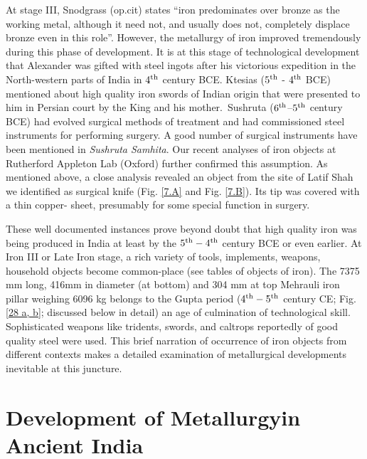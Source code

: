 At stage III, Snodgrass (op.cit) states “iron predominates over bronze as the working metal, although it need not, and usually does not, completely displace bronze even in this role”. However, the metallurgy of iron improved tremendously during this phase of development. It is at this stage of technological development that Alexander was gifted with steel ingots after his victorious expedition in the North-western parts of India in $4^{\rm th}$ century BCE. Ktesias ($5^{\rm th}$ - $4^{\rm th}$ BCE) mentioned about high quality iron swords of Indian origin that were presented to him in Persian court by the King and his mother.~Sushruta ($6^{\rm th}$–$5^{\rm th}$ century BCE) had evolved surgical methods of treatment and had commissioned steel instruments for performing surgery. A good number of surgical instruments have been mentioned in {\it Sushruta Samhita}. Our recent analyses of iron objects at Rutherford Appleton Lab (Oxford) further confirmed this assumption. As mentioned above, a close analysis revealed an object from the site of Latif Shah we identified as surgical knife (Fig. \ref{7.A} and Fig. \ref{7.B}). Its tip was covered with a thin copper- sheet, presumably for some special function in surgery. 

These well documented instances prove beyond doubt that high quality iron was being produced in India at least by the $5^{\rm th} - 4^{\rm th}$ century BCE or even earlier. At Iron III or Late Iron stage, a rich variety of tools, implements, weapons, household objects become common-place (see tables of objects of iron). The 7375 mm long, 416mm in diameter (at bottom) and 304 mm at top Mehrauli iron pillar weighing 6096 kg belongs to the Gupta period ($4^{\rm th}-5^{\rm th}$ century CE; Fig. \ref{28 a, b}; discussed below in detail) an age of culmination of technological skill. Sophisticated weapons like tridents, swords, and caltrops reportedly of good quality steel were used. This brief narration of occurrence of iron objects from different contexts makes a detailed examination of metallurgical developments inevitable at this juncture.

\vspace{-.3cm}

\section*{Development of Metallurgy\hfill \break in Ancient India}\label{section-1}

